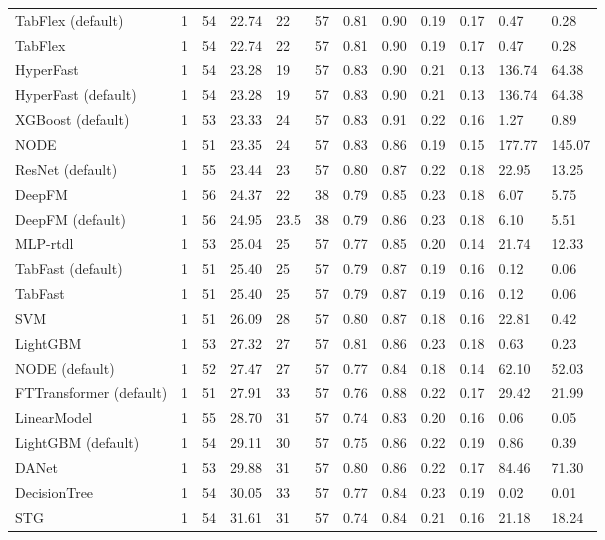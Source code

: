 \begin{tabular}{lllllrllllll}
TabFlex (default) & 1 & 54 & 22.74 & 22 & 57 & 0.81 & 0.90 & 0.19 & 0.17 & 0.47 & 0.28 \\
TabFlex & 1 & 54 & 22.74 & 22 & 57 & 0.81 & 0.90 & 0.19 & 0.17 & 0.47 & 0.28 \\
HyperFast & 1 & 54 & 23.28 & 19 & 57 & 0.83 & 0.90 & 0.21 & 0.13 & 136.74 & 64.38 \\
HyperFast (default) & 1 & 54 & 23.28 & 19 & 57 & 0.83 & 0.90 & 0.21 & 0.13 & 136.74 & 64.38 \\
XGBoost (default) & 1 & 53 & 23.33 & 24 & 57 & 0.83 & 0.91 & 0.22 & 0.16 & 1.27 & 0.89 \\
NODE & 1 & 51 & 23.35 & 24 & 57 & 0.83 & 0.86 & 0.19 & 0.15 & 177.77 & 145.07 \\
ResNet (default) & 1 & 55 & 23.44 & 23 & 57 & 0.80 & 0.87 & 0.22 & 0.18 & 22.95 & 13.25 \\
DeepFM & 1 & 56 & 24.37 & 22 & 38 & 0.79 & 0.85 & 0.23 & 0.18 & 6.07 & 5.75 \\
DeepFM (default) & 1 & 56 & 24.95 & 23.5 & 38 & 0.79 & 0.86 & 0.23 & 0.18 & 6.10 & 5.51 \\
MLP-rtdl & 1 & 53 & 25.04 & 25 & 57 & 0.77 & 0.85 & 0.20 & 0.14 & 21.74 & 12.33 \\
TabFast (default) & 1 & 51 & 25.40 & 25 & 57 & 0.79 & 0.87 & 0.19 & 0.16 & 0.12 & 0.06 \\
TabFast & 1 & 51 & 25.40 & 25 & 57 & 0.79 & 0.87 & 0.19 & 0.16 & 0.12 & 0.06 \\
SVM & 1 & 51 & 26.09 & 28 & 57 & 0.80 & 0.87 & 0.18 & 0.16 & 22.81 & 0.42 \\
LightGBM & 1 & 53 & 27.32 & 27 & 57 & 0.81 & 0.86 & 0.23 & 0.18 & 0.63 & 0.23 \\
NODE (default) & 1 & 52 & 27.47 & 27 & 57 & 0.77 & 0.84 & 0.18 & 0.14 & 62.10 & 52.03 \\
FTTransformer (default) & 1 & 51 & 27.91 & 33 & 57 & 0.76 & 0.88 & 0.22 & 0.17 & 29.42 & 21.99 \\
LinearModel & 1 & 55 & 28.70 & 31 & 57 & 0.74 & 0.83 & 0.20 & 0.16 & 0.06 & 0.05 \\
LightGBM (default) & 1 & 54 & 29.11 & 30 & 57 & 0.75 & 0.86 & 0.22 & 0.19 & 0.86 & 0.39 \\
DANet & 1 & 53 & 29.88 & 31 & 57 & 0.80 & 0.86 & 0.22 & 0.17 & 84.46 & 71.30 \\
DecisionTree & 1 & 54 & 30.05 & 33 & 57 & 0.77 & 0.84 & 0.23 & 0.19 & 0.02 & 0.01 \\
STG & 1 & 54 & 31.61 & 31 & 57 & 0.74 & 0.84 & 0.21 & 0.16 & 21.18 & 18.24 \\

\end{tabular}
